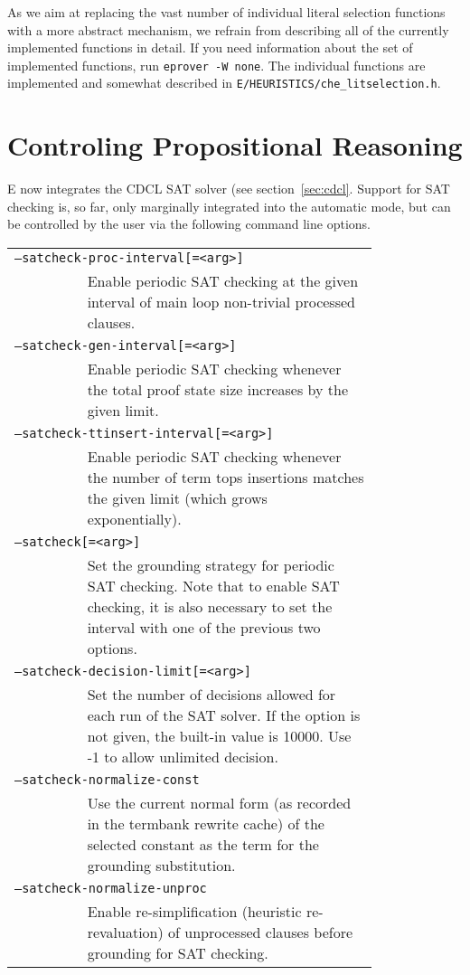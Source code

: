 \documentclass{report}
\begin{document}
As we aim at replacing the vast number of individual literal selection
functions with a more abstract mechanism, we refrain from describing
all of the currently implemented functions in detail. If you need
information about the set of implemented functions, run
\texttt{eprover -W none}. The individual functions are implemented and
somewhat described in \texttt{E/HEURISTICS/che\_litselection.h}.


\section{Controling Propositional Reasoning}
\label{sec:cdclopt}

E now integrates the CDCL SAT solver  (see
section~\ref{sec:cdcl}.  Support for SAT checking is, so far, only
marginally integrated into the automatic mode, but can be controlled
by the user via the following command line options.

\begin{tabular}{lp{0.8\linewidth}}
  \multicolumn{2}{l}{\texttt{--satcheck-proc-interval[=<arg>]}} \\
  & Enable periodic SAT checking at the given interval of main loop
    non-trivial processed clauses.\\
  \multicolumn{2}{l}{\texttt{--satcheck-gen-interval[=<arg>]}} \\
  & Enable periodic SAT checking whenever the total proof state size
    increases by the given limit. \\
  \multicolumn{2}{l}{\texttt{--satcheck-ttinsert-interval[=<arg>]}}\\
  & Enable periodic SAT checking whenever the number of term tops insertions
    matches the given limit (which grows exponentially).\\
  \multicolumn{2}{l}{\texttt{--satcheck[=<arg>]}}\\
  & Set the grounding strategy for periodic SAT checking. Note that to enable
    SAT checking, it is also necessary to set the interval with one of the
    previous two options. \\
  \multicolumn{2}{l}{\texttt{--satcheck-decision-limit[=<arg>]}}\\
  & Set the number of decisions allowed for each run of the SAT solver. If
    the option is not given, the built-in value is 10000. Use -1 to allow
    unlimited decision. \\
  \multicolumn{2}{l}{\texttt{--satcheck-normalize-const}}\\
  & Use the current normal form (as recorded in the termbank rewrite cache)
    of the selected constant as the term for the grounding substitution.\\
  \multicolumn{2}{l}{\texttt{--satcheck-normalize-unproc}}\\
  & Enable re-simplification (heuristic re-revaluation) of unprocessed
    clauses before grounding for SAT checking.\\
\end{tabular}
\end{document}
